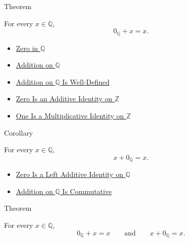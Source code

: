 \begin{theorembox}{Theorem}
\begin{theorem}
\label{thm:zero-left-additive-identity-on-q}
For every $x\in\mathbb{Q}$,
\[
0_{\mathbb{Q}}+x=x.
\]
\end{theorem}
\end{theorembox}

\begin{dependencies}
\begin{itemize}
  \item \hyperref[def:zero-in-q]{Zero in $\mathbb{Q}$}
  \item \hyperref[def:addition-on-q-classes]{Addition on $\mathbb{Q}$}
  \item \hyperref[thm:addition-on-q-well-defined]{Addition on $\mathbb{Q}$ Is Well-Defined}
  \item \hyperref[thm:zero-additive-identity-on-z]{Zero Is an Additive Identity on $\mathbb{Z}$}
  \item \hyperref[thm:one-multiplicative-identity-on-z]{One Is a Multiplicative Identity on $\mathbb{Z}$}
\end{itemize}
\end{dependencies}

\begin{corollarybox}{Corollary}
\begin{corollary}
\label{cor:zero-right-additive-identity-on-q}
For every $x\in\mathbb{Q}$,
\[
x+0_{\mathbb{Q}}=x.
\]
\end{corollary}
\end{corollarybox}

\begin{dependencies}
\begin{itemize}
  \item \hyperref[thm:zero-left-additive-identity-on-q]{Zero Is a Left Additive Identity on $\mathbb{Q}$}
  \item \hyperref[thm:addition-on-q-commutative]{Addition on $\mathbb{Q}$ Is Commutative}
\end{itemize}
\end{dependencies}

\begin{theorembox}{Theorem}
\begin{theorem}
\label{thm:zero-additive-identity-on-q}
For every $x\in\mathbb{Q}$,
\[
0_{\mathbb{Q}}+x=x
\qquad\text{and}\qquad
x+0_{\mathbb{Q}}=x.
\]
\end{theorem}
\end{theorembox}

